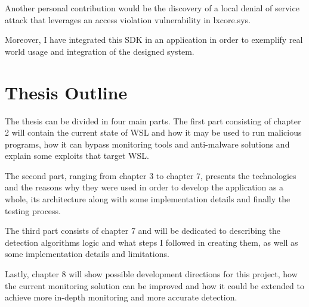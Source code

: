         Another personal contribution would be the discovery of a local denial of service attack that leverages an access violation vulnerability
        in lxcore.sys.

        Moreover, I have integrated this SDK in an application in order to exemplify real world usage and integration of the designed
        system. 
        
    \section{Thesis Outline}
        The thesis can be divided in four main parts. The first part consisting of chapter 2 will contain the current state of WSL and how it may
        be used to run malicious programs, how it can bypass monitoring tools and anti-malware solutions and explain some exploits
        that target WSL.

        The second part, ranging from chapter 3 to chapter 7, presents the technologies and the reasons why they were used in order to
        develop the application as a whole, its architecture along with some implementation details and finally the testing process.

        The third part consists of chapter 7 and will be dedicated to describing the detection algorithms logic and what steps I followed in
        creating them, as well as some implementation details and limitations.

        Lastly, chapter 8 will show possible development directions for this project, how the current monitoring solution can be improved and
        how it could be extended to achieve more in-depth monitoring and more accurate detection.
        